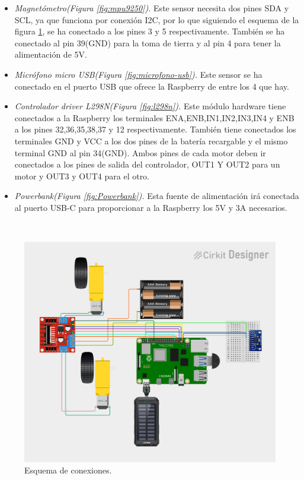 \begin{itemize}
 \item \textit{Magnetómetro(Figura \ref{fig:mpu9250}).} Este sensor necesita dos pines SDA y SCL, ya que funciona por conexión I2C, por lo que siguiendo el esquema de la figura \ref{fig:circuito}, se ha conectado a los pines 3 y 5 respectivamente. También se ha conectado al pin 39(GND) para la toma de tierra y al pin 4 para tener la alimentación de  5V. 
 \item \textit{Micrófono micro USB(Figura \ref{fig:microfono-usb}).} Este sensor se ha conectado en el puerto USB que ofrece la Raspberry de entre los 4 que hay.
 \item \textit{Controlador driver L298N(Figura \ref{fig:l298n}).} Este módulo hardware tiene conectados a la Raspberry los terminales ENA,ENB,IN1,IN2,IN3,IN4 y ENB a los pines 32,36,35,38,37 y 12 respectivamente. También tiene conectados los terminales GND y VCC a los dos pines de la batería recargable y el mismo terminal GND al pin 34(GND). Ambos pines de cada motor deben ir conectados a los pines de salida del controlador, OUT1 Y OUT2 para un motor y OUT3 y OUT4 para el otro.
 \item \textit{Powerbank(Figura \ref{fig:Powerbank}).} Esta fuente de alimentación irá conectada al puerto USB-C para proporcionar a la Raspberry los 5V y 3A necesarios.
\end{itemize}\


\begin{figure}[H]
  \centering
  \includegraphics[scale=0.5]{figs/final_circuito} %
  \caption{Esquema de conexiones.}
  \label{fig:circuito}
\end{figure}

